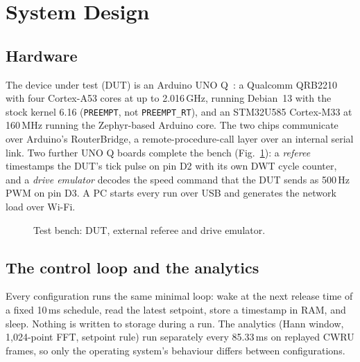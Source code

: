 \section{System Design}
\label{sec:system}

\subsection{Hardware}
The device under test (DUT) is an Arduino UNO Q~\cite{arduino_unoq}: a Qualcomm QRB2210 with four Cortex-A53 cores at up to 2.016\,GHz, running Debian~13 with the stock kernel 6.16 (\texttt{PREEMPT}, not \texttt{PREEMPT\_RT}), and an STM32U585 Cortex-M33 at 160\,MHz running the Zephyr-based Arduino core. The two chips communicate over Arduino's RouterBridge, a remote-procedure-call layer over an internal serial link. Two further UNO Q boards complete the bench (Fig.~\ref{fig:bench}): a \emph{referee} timestamps the DUT's tick pulse on pin D2 with its own DWT cycle counter, and a \emph{drive emulator} decodes the speed command that the DUT sends as 500\,Hz PWM on pin D3. A PC starts every run over USB and generates the network load over Wi-Fi.

\begin{figure}[t]
\centering
\setlength{\fboxsep}{6pt}
\caption{Test bench: DUT, external referee and drive emulator.}
\label{fig:bench}
\end{figure}

\subsection{The control loop and the analytics}
Every configuration runs the same minimal loop: wake at the next release time of a fixed 10\,ms schedule, read the latest setpoint, store a timestamp in RAM, and sleep. Nothing is written to storage during a run. The analytics (Hann window, 1{,}024-point FFT, setpoint rule) run separately every 85.33\,ms on replayed CWRU frames, so only the operating system's behaviour differs between configurations.

